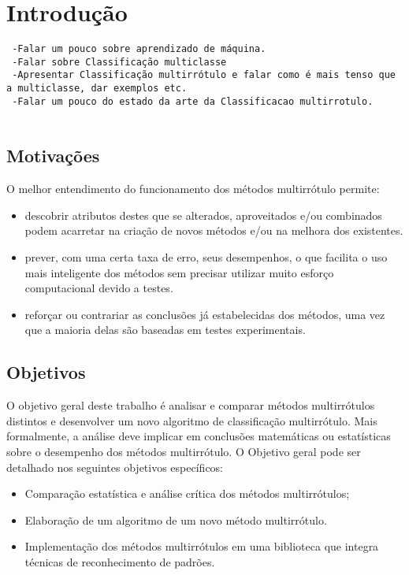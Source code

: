 
\newcommand{\NbasesV}{\textit{N}}
\newcommand{\Nbases}{6}
\newcommand{\Nml}{6}
\newcommand{\NmlT}{5}
\newcommand{\NmlA}{2}
\newcommand{\Ncb}{4}
\newcommand{\MML}{método multirrótulo}
\newcommand{\MMLs}{métodos multirrótulo}
\newcommand{\MRLM}{Recursive Dependent Binary Relevance}
\newcommand{\MRLMa}{RDBR}

\chapter{Introdução}
\begin{verbatim}
 -Falar um pouco sobre aprendizado de máquina.
 -Falar sobre Classificação multiclasse
 -Apresentar Classificação multirrótulo e falar como é mais tenso que a multiclasse, dar exemplos etc.
 -Falar um pouco do estado da arte da Classificacao multirrotulo.
 
\end{verbatim}



\section{Motivações}
O melhor entendimento do funcionamento dos métodos multirrótulo permite:
\begin{itemize}
 \item descobrir atributos destes que se alterados, aproveitados
 e/ou combinados podem acarretar na criação de novos métodos e/ou na melhora dos existentes.
 \item prever, com uma certa taxa de erro, seus desempenhos, o que facilita o uso mais inteligente dos métodos
 sem precisar utilizar muito esforço computacional devido a testes.
 \item reforçar ou contrariar as conclusões já estabelecidas dos métodos, uma vez que a maioria delas são 
 baseadas em testes experimentais.
\end{itemize}

\section{Objetivos}
O objetivo geral deste trabalho é analisar e comparar métodos multirrótulos distintos e 
desenvolver um novo algoritmo de classificação multirrótulo.
Mais formalmente, a análise deve implicar em conclusões matemáticas ou estatísticas sobre o desempenho dos métodos multirrótulo.
O Objetivo geral pode ser detalhado nos seguintes objetivos específicos:
\begin{itemize}
 \item Comparação estatística e análise crítica dos métodos multirrótulos;
 \item Elaboração de um algoritmo de um novo método multirrótulo.
 \item Implementação dos métodos multirrótulos em uma biblioteca que integra técnicas de reconhecimento de padrões.
\end{itemize}


